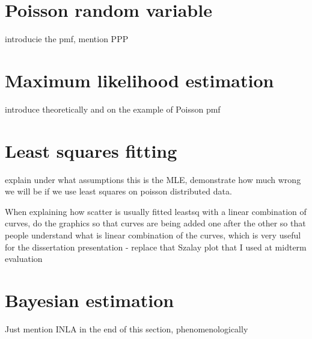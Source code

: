 \section{Poisson random variable}

introducie the pmf, mention PPP

\section{Maximum likelihood estimation}

introduce theoretically and on the example of Poisson pmf

\section{Least squares fitting}

explain under what assumptions this is the MLE, demonstrate how much wrong we will be if we use least squares on poisson distributed data. 

When explaining how scatter is usually fitted leastsq with a linear combination of curves, do the graphics so that curves are being added one after the other so that people understand what is linear combination of the curves, which is very useful for the dissertation presentation - replace that Szalay plot that I used at midterm evaluation

\section{Bayesian estimation}

Just mention INLA in the end of this section, phenomenologically














